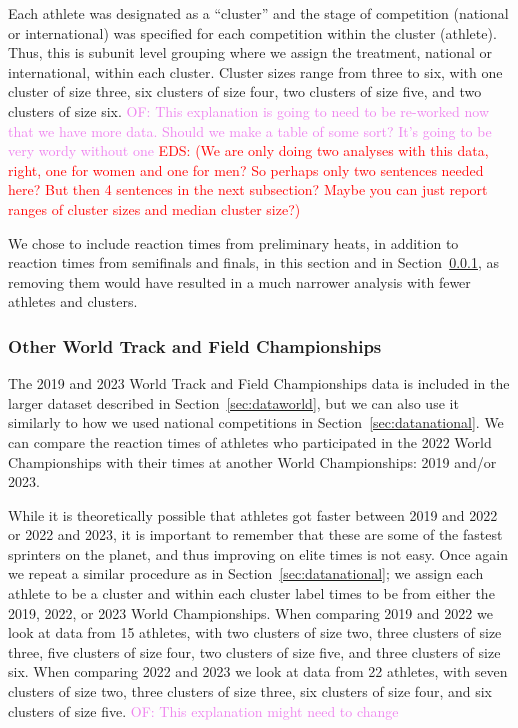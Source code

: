 \documentclass[12pt, letterpaper]{article}
\newcommand{\eds}[1]{\textcolor{red}{EDS: (#1)}}
\newcommand{\of}[1]{\textcolor{violet}{OF: #1}}
\begin{document}
Each athlete was designated as a ``cluster'' and the stage of competition (national
or international) was specified for each competition within the cluster (athlete).
Thus, this is subunit level grouping where we assign the treatment, national or
international, within each cluster. Cluster sizes range from three to six, with
one cluster of size three, six clusters of size four, two clusters of size five,
and two clusters of size six.
\of{This explanation is going to need to be re-worked now that we have more data.
Should we make a table of some sort? It's going to be very wordy without one}
\eds{We are only doing two analyses with this data, right, one for women 
and one for men?  So perhaps only two sentences needed here? But then 4 sentences
in the next subsection?  Maybe you can just report ranges of cluster sizes and 
median cluster size?}

We chose to include reaction times from preliminary heats, in addition to 
reaction times from semifinals and finals, in this section and in
Section~\ref{sec:data2019}, as removing them would have resulted in a much
narrower analysis with fewer athletes and clusters.


\subsubsection{Other World Track and Field Championships}\label{sec:data2019}
The 2019 and 2023 World Track and Field Championships data is included in the 
larger dataset described in Section~\ref{sec:dataworld}, but we can also use it
similarly to how we used national competitions in Section~\ref{sec:datanational}. 
We can compare the reaction times of athletes who participated in the 2022 World 
Championships with their times at another World Championships: 2019 and/or 2023.


While it is theoretically possible that athletes got faster 
between 2019 and 2022 or 2022 and 2023, it is important to 
remember that these are some of the fastest sprinters on the planet, and thus
improving on elite times is not easy. Once again we repeat a similar procedure
as in Section~\ref{sec:datanational}; we assign each athlete to be a cluster and
within each cluster label times to be from either the 2019, 2022, or 2023 World
Championships. When comparing 2019 and 2022 we look at data from 15
athletes, with two clusters of size two, three clusters of size three, five 
clusters of size four, two clusters of size five, and three clusters of size six.
When comparing 2022 and 2023 we look at data from 22 athletes, with seven 
clusters of size two, three clusters of size three, six clusters of size four,
and six clusters of size five.
\of{This explanation might need to change}
\end{document}
